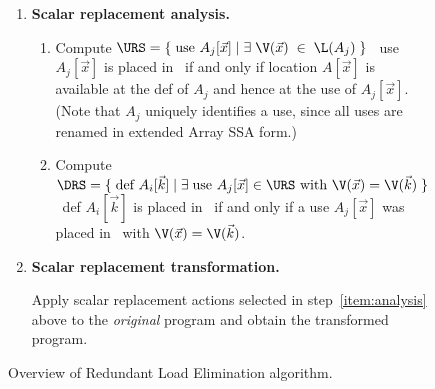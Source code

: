 {\begin{figure}
{\begin{enumerate}
\item \label{item:analysis}
{\bf Scalar replacement analysis.}

\begin{enumerate}
\item Compute $\URS = \{\; \mbox{use $A_j[\vec{x}]$} \; | \; \exists\; \V(\vec{x}) \; \in \; \L(A_j)\;\}$ \ie\
use $A_j[\vec{x}]$ is placed in \URS\ if and only if location $A[\vec{x}]$ is available
at the def of $A_j$ and hence at the use of $A_j[\vec{x}]$.
(Note that $A_j$ uniquely identifies a use, since all uses are renamed in
extended Array SSA form.)

\item Compute $\DRS = \{\;  \mbox{def $A_i[\vec{k}]$} \; | \; \exists \; \mbox{use $A_j[\vec{x}] \in \URS$ with $\V(\vec{x})=\V(\vec{k})$} \; \}$ \ie\ def  $A_i[\vec{k}]$ is placed in \DRS\ 
if and only if a use $A_j[\vec{x}]$ was placed in \URS\ with  $\V(\vec{x})=\V(\vec{k})$.
\end{enumerate}

\item \label{item:transform}
{\bf Scalar replacement transformation.}

Apply scalar replacement actions selected in step~\ref{item:analysis}
above
to the {\it original} program and
obtain the transformed program.

\end{enumerate}
}
\caption{Overview of Redundant Load Elimination algorithm.}
\label{fig:overview}
\end{figure}
}
